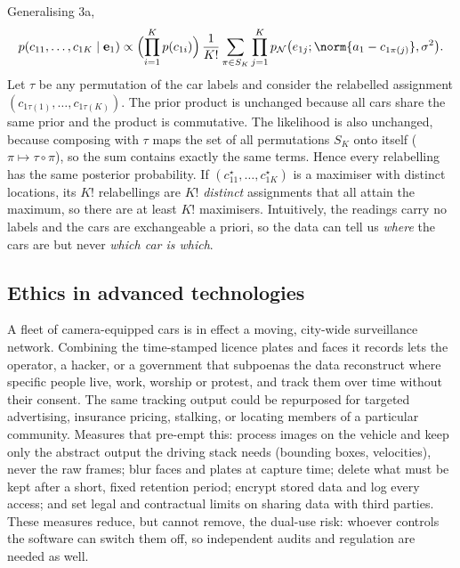 \begin{solution}
Generalising 3a,
\[
p(c_{11},\dots,c_{1K}\mid\mathbf e_1)\propto\Bigl(\prod_{i=1}^K p(c_{1i})\Bigr)\,
\frac1{K!}\sum_{\pi\in S_K}\prod_{j=1}^K p_{\mathcal N}\bigl(e_{1j};\norm{a_1-c_{1\pi(j)}},\sigma^2\bigr).
\]
Let $\tau$ be any permutation of the car labels and consider the relabelled assignment
$(c_{1\tau(1)},\dots,c_{1\tau(K)})$. The prior product is unchanged because all cars share the same prior and the
product is commutative. The likelihood is also unchanged, because composing with $\tau$ maps the set of all
permutations $S_K$ onto itself ($\pi\mapsto\tau\circ\pi$), so the sum contains exactly the same terms. Hence every
relabelling has the same posterior probability. If $(c^\star_{11},\dots,c^\star_{1K})$ is a maximiser with
distinct locations, its $K!$ relabellings are $K!$ \emph{distinct} assignments that all attain the maximum, so
there are at least $K!$ maximisers. Intuitively, the readings carry no labels and the cars are exchangeable a priori,
so the data can tell us \emph{where} the cars are but never \emph{which car is which}.
\end{solution}

\subsection{Ethics in advanced technologies}

\begin{solution}
A fleet of camera-equipped cars is in effect a moving, city-wide surveillance network. Combining the time-stamped
licence plates and faces it records lets the operator, a hacker, or a government that subpoenas the data
reconstruct where specific people live, work, worship or protest, and track them over time without their consent.
The same tracking output could be repurposed for targeted advertising, insurance pricing, stalking, or locating
members of a particular community. Measures that pre-empt this: process images on the vehicle and keep only the
abstract output the driving stack needs (bounding boxes, velocities), never the raw frames; blur faces and plates
at capture time; delete what must be kept after a short, fixed retention period; encrypt stored data and log every
access; and set legal and contractual limits on sharing data with third parties. These measures reduce, but cannot
remove, the dual-use risk: whoever controls the software can switch them off, so independent audits and
regulation are needed as well.
\end{solution}

